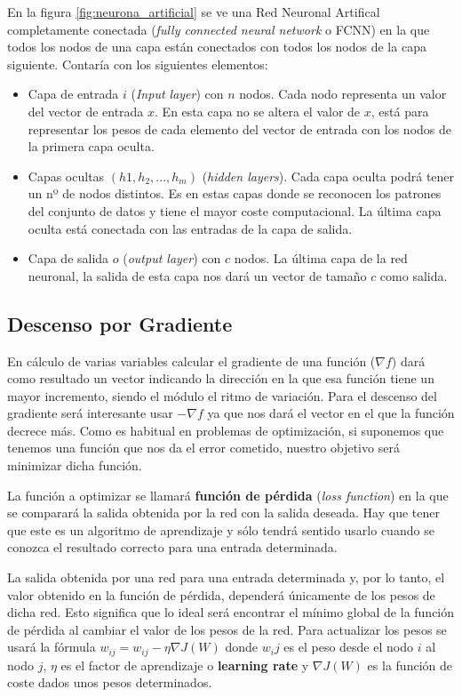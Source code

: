 En la figura \ref{fig:neurona_artificial} se ve una Red Neuronal Artifical completamente conectada (\textit{fully connected neural network} o FCNN) en la que todos los nodos de una capa están conectados con todos los nodos de la capa siguiente. Contaría con los siguientes elementos:
\begin{itemize}
\item Capa de entrada $i$ (\textit{Input layer}) con $ n $ nodos. Cada nodo representa un valor del vector de entrada $ x $. En esta capa no se altera el valor de $x$, está para representar los pesos de cada elemento del vector de entrada con los nodos de la primera capa oculta.
\item Capas ocultas $(h1, h_2, ..., h_m)$ (\textit{hidden layers}). Cada capa oculta podrá tener un nº de nodos distintos. Es en estas capas donde se reconocen los patrones del conjunto de datos y tiene el mayor coste computacional. La última capa oculta está conectada con las entradas de la capa de salida.
\item Capa de salida $o$ (\textit{output layer}) con $c$ nodos. La última capa de la red neuronal, la salida de esta capa nos dará un vector de tamaño $c$ como salida.
\end{itemize}

\subsection{Descenso por Gradiente }\label{sec:gradient_descent}

En cálculo de varias variables calcular el gradiente de una función ($\nabla f$) dará como resultado un vector indicando la dirección en la que esa función tiene un mayor incremento, siendo el módulo el ritmo de variación. Para el descenso del gradiente será interesante usar $-\nabla f$ ya que nos dará el vector en el que la función decrece más. Como es habitual en problemas de optimización, si suponemos que tenemos una función que nos da el error cometido, nuestro objetivo será minimizar dicha función.

La función a optimizar se llamará \textbf{función de pérdida} (\textit{loss function}) en la que se comparará la salida obtenida por la red con la salida deseada. Hay que tener que este es un algoritmo de aprendizaje y sólo tendrá sentido usarlo cuando se conozca el resultado correcto para una entrada determinada.

La salida obtenida por una red para una entrada determinada y, por lo tanto, el valor obtenido en la función de pérdida, dependerá únicamente de los pesos de dicha red. Esto significa que lo ideal será encontrar el mínimo global de la función de pérdida al cambiar el valor de los pesos de la red. Para actualizar los pesos se usará la fórmula $w_{ij} = w_{ij} - \eta \nabla J(W)$ donde $w_ij$ es el peso desde el nodo $i$ al nodo $j$, $\eta$ es el factor de aprendizaje o \textbf{learning rate} y $\nabla J(W)$ es la función de coste dados unos pesos determinados.

